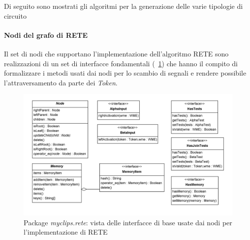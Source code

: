 Di seguito sono mostrati gli algoritmi per la generazione delle varie tipologie di circuito













%



%

%

%

%

%

%

%

\clearpage

\paragraph{Nodi del grafo di RETE}

Il set di nodi che supportano l'implementazione dell'algoritmo RETE sono realizzazioni di un set di interfacce fondamentali (\figurename~\ref{fig:class-myclips-rete-interfaces}) che hanno il compito di formalizzare i metodi usati dai nodi per lo scambio di segnali e rendere possibile l'attraversamento da parte dei \emph{Token}.

\begin{figure}
\centering
\includegraphics[width=1\textwidth]{Immagini/Capitolo3/Classi/myclips_rete_Interfacce.png}
\caption{Package \emph{myclips.rete}: vista delle interfacce di base usate dai nodi per l'implementazione di RETE}\label{fig:class-myclips-rete-interfaces}
\end{figure}

